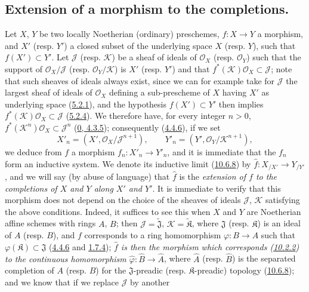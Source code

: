 \subsection{Extension of a morphism to the completions.}
\label{subsection:I.10.9}

\begin{env}[10.9.1]
\label{I.10.9.1}
Let $X$, $Y$ be two locally Noetherian (ordinary) preschemes,
$f:X\to Y$ a morphism, and $X'$ (resp. $Y'$) a closed subset of the
underlying space $X$ (resp. $Y$), such that $f(X')\subset Y'$. Let
$\mathscr{J}$ (resp. $\mathscr{K}$) be a sheaf of ideals of
$\mathscr{O}_X$ (resp. $\mathscr{O}_Y$) such that the support of
$\mathscr{O}_X/\mathscr{J}$ (resp. $\mathscr{O}_Y/\mathscr{K}$) is
$X'$ (resp. $Y'$) and that
$f^*(\mathscr{K})\mathscr{O}_X\subset\mathscr{J}$; note that such
sheaves of ideals always exist, since we can for example take for
$\mathscr{J}$ the largest sheaf of ideals of $\mathscr{O}_X$
defining a sub-prescheme of $X$ having $X'$ as underlying space
(\hyperref[I.5.2.1]{5.2.1}), and the hypothesis $f(X')\subset Y'$ then
implies $f^*(\mathscr{K})\mathscr{O}_X\subset\mathscr{J}$
(\hyperref[I.5.2.4]{5.2.4}). We therefore have, for every integer
$n>0$, $f^*(\mathscr{K}^n)\mathscr{O}_X\subset\mathscr{J}^n$
(\hyperref[0.4.3.5]{0, 4.3.5}); consequently
(\hyperref[I.4.4.6]{4.4.6}), if we set
\[
  X'_n=(X',\mathscr{O}_X/\mathscr{J}^{n+1}),\qquad
  Y'_n=(Y',\mathscr{O}_Y/\mathscr{K}^{n+1}),
\]
we deduce from $f$ a morphism $f_n:X'_n\to Y'_n$, and it is immediate
that the $f_n$ form an inductive system. We denote its inductive limit
(\hyperref[I.10.6.8]{10.6.8}) by
$\widehat f:X_{/X'}\to Y_{/Y'}$, and we will say (by abuse of language)
that $\widehat f$ is the \emph{extension of $f$ to the completions of
$X$ and $Y$ along $X'$ and $Y'$}. It is immediate to verify that this
morphism does not depend on the choice of the sheaves of ideals
$\mathscr{J}$, $\mathscr{K}$ satisfying the above conditions. Indeed, it
suffices to see this when $X$ and $Y$ are Noetherian affine schemes with
rings $A$, $B$; then
$\mathscr{J}=\widetilde{\mathfrak{J}}$,
$\mathscr{K}=\widetilde{\mathfrak{K}}$, where $\mathfrak{J}$ (resp.
$\mathfrak{K}$) is an ideal of $A$ (resp. $B$), and $f$ corresponds to a
ring homomorphism $\varphi:B\to A$ such that
$\varphi(\mathfrak{K})\subset\mathfrak{J}$
(\hyperref[I.4.4.6]{4.4.6} and
\hyperref[I.1.7.4]{1.7.4}); \emph{$\widehat f$ is then the morphism
which corresponds (\hyperref[I.10.2.2]{10.2.2}) to the continuous
homomorphism $\widehat\varphi:\widehat B\to\widehat A$}, where
$\widehat A$ (resp. $\widehat B$) is the separated completion of $A$
(resp. $B$) for the $\mathfrak{J}$-preadic (resp. $\mathfrak{K}$-preadic)
topology (\hyperref[I.10.6.8]{10.6.8}); and we know that if we
replace $\mathscr{J}$ by another


\end{env}
